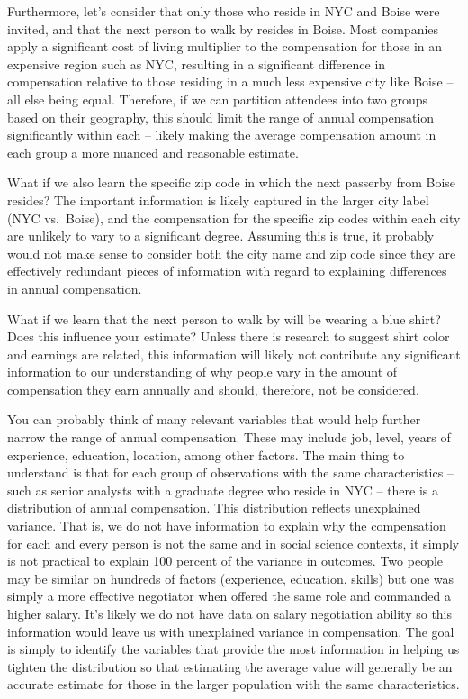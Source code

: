\documentclass[]{book}
\begin{document}
Furthermore, let's consider that only those who reside in NYC and Boise were invited, and that the next person to walk by resides in Boise. Most companies apply a significant cost of living multiplier to the compensation for those in an expensive region such as NYC, resulting in a significant difference in compensation relative to those residing in a much less expensive city like Boise -- all else being equal. Therefore, if we can partition attendees into two groups based on their geography, this should limit the range of annual compensation significantly within each -- likely making the average compensation amount in each group a more nuanced and reasonable estimate.

What if we also learn the specific zip code in which the next passerby from Boise resides? The important information is likely captured in the larger city label (NYC vs.~Boise), and the compensation for the specific zip codes within each city are unlikely to vary to a significant degree. Assuming this is true, it probably would not make sense to consider both the city name and zip code since they are effectively redundant pieces of information with regard to explaining differences in annual compensation.

What if we learn that the next person to walk by will be wearing a blue shirt? Does this influence your estimate? Unless there is research to suggest shirt color and earnings are related, this information will likely not contribute any significant information to our understanding of why people vary in the amount of compensation they earn annually and should, therefore, not be considered.

You can probably think of many relevant variables that would help further narrow the range of annual compensation. These may include job, level, years of experience, education, location, among other factors. The main thing to understand is that for each group of observations with the same characteristics -- such as senior analysts with a graduate degree who reside in NYC -- there is a distribution of annual compensation. This distribution reflects unexplained variance. That is, we do not have information to explain why the compensation for each and every person is not the same and in social science contexts, it simply is not practical to explain 100 percent of the variance in outcomes. Two people may be similar on hundreds of factors (experience, education, skills) but one was simply a more effective negotiator when offered the same role and commanded a higher salary. It's likely we do not have data on salary negotiation ability so this information would leave us with unexplained variance in compensation. The goal is simply to identify the variables that provide the most information in helping us tighten the distribution so that estimating the average value will generally be an accurate estimate for those in the larger population with the same characteristics.
\end{document}

